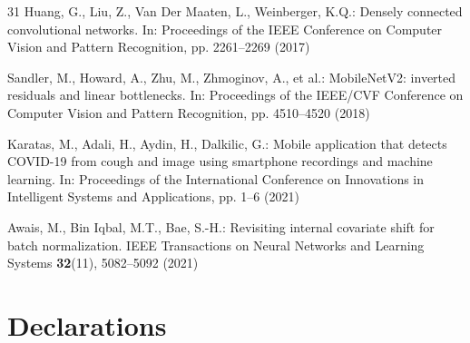 \begin{thebibliography}{31}
Huang, G., Liu, Z., Van Der Maaten, L., Weinberger, K.Q.: Densely connected
convolutional networks. In: Proceedings of the IEEE Conference on Computer
Vision and Pattern Recognition, pp. 2261--2269 (2017)

Sandler, M., Howard, A., Zhu, M., Zhmoginov, A., et al.: MobileNetV2: inverted
residuals and linear bottlenecks. In: Proceedings of the IEEE/CVF Conference
on Computer Vision and Pattern Recognition, pp. 4510--4520 (2018)

Karatas, M., Adali, H., Aydin, H., Dalkilic, G.: Mobile application that
detects COVID-19 from cough and image using smartphone recordings and machine
learning. In: Proceedings of the International Conference on Innovations in
Intelligent Systems and Applications, pp. 1--6 (2021)

Awais, M., Bin Iqbal, M.T., Bae, S.-H.: Revisiting internal covariate shift
for batch normalization. IEEE Transactions on Neural Networks and Learning
Systems \textbf{32}(11), 5082--5092 (2021)

\end{thebibliography}

\section*{Declarations}


